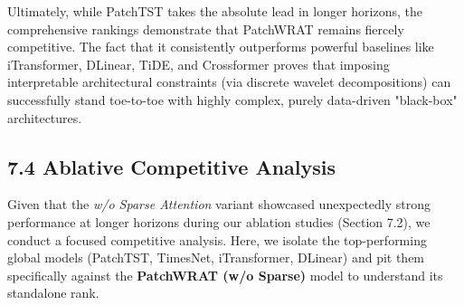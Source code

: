 \documentclass[11pt, letterpaper]{article}
\begin{document}
Ultimately, while PatchTST takes the absolute lead in longer horizons, the comprehensive rankings demonstrate that PatchWRAT remains fiercely competitive. The fact that it consistently outperforms powerful baselines like iTransformer, DLinear, TiDE, and Crossformer proves that imposing interpretable architectural constraints (via discrete wavelet decompositions) can successfully stand toe-to-toe with highly complex, purely data-driven "black-box" architectures.

\subsection{7.4 Ablative Competitive Analysis}
Given that the \textit{w/o Sparse Attention} variant showcased unexpectedly strong performance at longer horizons during our ablation studies (Section 7.2), we conduct a focused competitive analysis. Here, we isolate the top-performing global models (PatchTST, TimesNet, iTransformer, DLinear) and pit them specifically against the \textbf{PatchWRAT (w/o Sparse)} model to understand its standalone rank.
\end{document}
